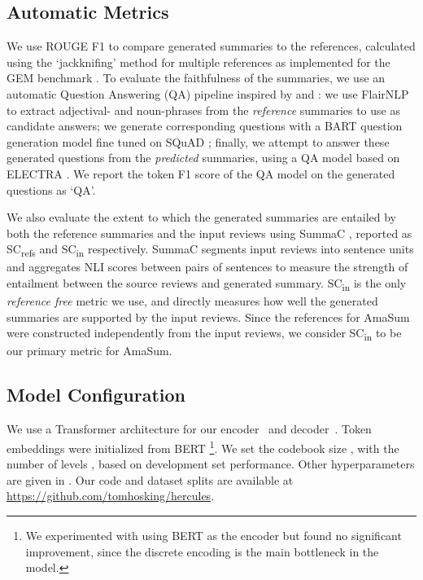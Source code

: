 \documentclass[11pt]{article}
\begin{document}
\subsection{Automatic Metrics}

We use ROUGE F1 \cite[][\mbox{R-2/R-L} in Tables \ref{tab:automatic_general} and \ref{tab:aspect_scores}]{lin-2004-rouge} to compare generated summaries to the references, calculated using the `jackknifing' method for multiple references as implemented for the GEM benchmark \cite{gehrmann-etal-2021-gem}. To evaluate the faithfulness of the summaries, we use an automatic Question Answering (QA) pipeline inspired by \citet{fabbri-etal-2022-qafacteval} and \citet{deutsch-etal-2021-towards}: we use FlairNLP \cite{flair} to extract adjectival- and noun-phrases from the \textit{reference} summaries to use as candidate answers; we generate corresponding questions with a BART question generation model fine tuned on SQuAD \cite{lewis-etal-2020-bart, rajpurkar-etal-2016-squad}; finally, we attempt to answer these generated questions from the \textit{predicted} summaries, using a QA model based on ELECTRA \cite{clark2020electra,bartolo-etal-2021-improving}. We report the token F1 score of the QA model on the generated questions as `QA'.

We also evaluate the extent to which the generated summaries are entailed by both the reference summaries and the input reviews using SummaC \cite{laban-etal-2022-summac}, reported as SC\textsubscript{refs} and SC\textsubscript{in} respectively. SummaC segments input reviews into sentence units and aggregates NLI scores between pairs of sentences to measure the strength of entailment between the source reviews and generated summary. SC\textsubscript{in} is the only \textit{reference free} metric we use, and directly measures how well the generated summaries are supported by the input reviews. Since the references for AmaSum were constructed independently from the input reviews, we consider SC\textsubscript{in} to be our primary metric for AmaSum.


\subsection{Model Configuration}

We use a Transformer architecture \cite{Vaswani2017} for our encoder~ and decoder~. Token embeddings were initialized from BERT \cite{devlin-etal-2019-bert}\footnote{We experimented with using BERT as the encoder but found no significant improvement, since the discrete encoding is the main bottleneck in the model.}. We set the codebook size , with the number of levels , based on development set performance. Other hyperparameters are given in . Our code and dataset splits are available at \mbox{\url{https://github.com/tomhosking/hercules}}.
 
\end{document}
